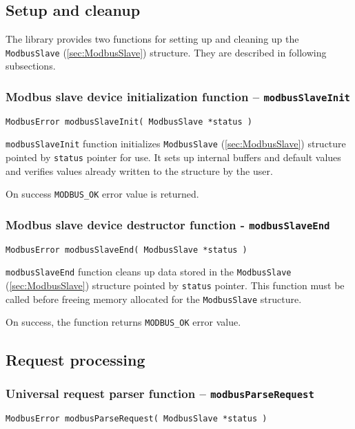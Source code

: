 \documentclass[11pt,a4paper]{article}
\newcommand{\coderef}[1]{\texttt{{#1}} (\ref{sec:#1})}
\begin{document}
\subsection{Setup and cleanup}
The library provides two functions for setting up and cleaning up the \coderef{ModbusSlave} structure. They are described in following subsections.


\subsubsection{Modbus slave device initialization function -- \texttt{modbusSlaveInit}} \label{sec:modbusSlaveInit} \label{sec:modbusSlaveInit}
\begin{lstlisting}[style=cproto]
ModbusError modbusSlaveInit( ModbusSlave *status )
\end{lstlisting}

\texttt{modbusSlaveInit} function initializes \coderef{ModbusSlave} structure pointed by \texttt{status} pointer for use. It sets up internal buffers and default values and verifies values already written to the structure by the user.\newline

On success \texttt{MODBUS\_OK} error value is returned.


\subsubsection{Modbus slave device destructor function - \texttt{modbusSlaveEnd}} \label{sec:modbusSlaveEnd}
\begin{lstlisting}[style=cproto]
ModbusError modbusSlaveEnd( ModbusSlave *status )
\end{lstlisting}

\texttt{modbusSlaveEnd} function cleans up data stored in the \coderef{ModbusSlave} structure pointed by \texttt{status} pointer. This function must be called before freeing memory allocated for the \texttt{ModbusSlave} structure.

On success, the function returns \texttt{MODBUS\_OK} error value.


\subsection{Request processing}
\subsubsection{Universal request parser function -- \texttt{modbusParseRequest}} \label{sec:modbusParseRequest}
\begin{lstlisting}[style=cproto]
ModbusError modbusParseRequest( ModbusSlave *status )
\end{lstlisting}
\end{document}
